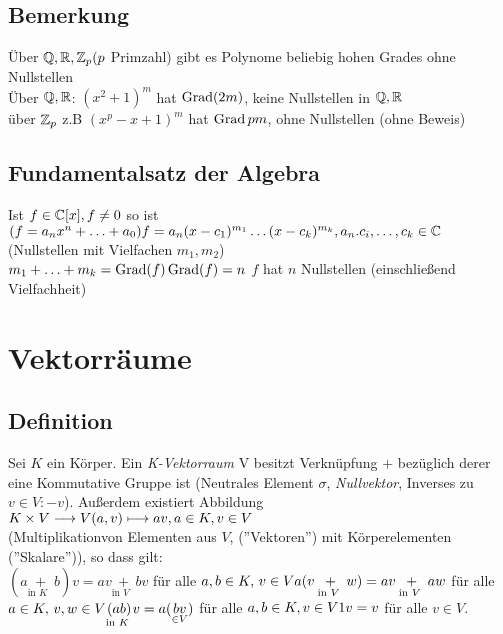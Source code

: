 \subsection{Bemerkung}
Über $\mathbb{Q},\mathbb{R},\mathbb{Z}_p (p$ Primzahl) gibt es Polynome beliebig hohen Grades ohne Nullstellen\\
Über $\mathbb{Q},\mathbb{R}$: $(x^2 +1)^m$ hat $\operatorname{Grad}(2m)$, keine Nullstellen in $\mathbb{Q},\mathbb{R}$\\
über $\mathbb{Z}_p$ z.B $(x^p - x +1)^m$ hat $\operatorname{Grad} pm$, ohne Nullstellen (ohne Beweis)
\subsection{Fundamentalsatz der Algebra}
Ist $ f \in \mathbb{C}[x], f \ne  0$ so ist $(f=a_nx^n+\ldots+a_0)\\
f = a_n (x-c_1)^{m_1} \ldots (x-c_k)^{m_k}, a_n.c_i,\ldots,c_k \in \mathbb{C}$ (Nullstellen mit Vielfachen $m_1,m_2$)\\
$m_1 + \ldots + m_k = \operatorname{Grad}(f)\\
\operatorname{Grad}(f) = n$ $f$ hat $n$ Nullstellen (einschlie\ss end Vielfachheit)
\section{Vektorräume}
\subsection{Definition}\label{sec:2.1}
Sei $K$ ein Körper. Ein \emph{K-Vektorraum}  V besitzt Verknüpfung $+$ bezüglich derer eine Kommutative Gruppe ist (Neutrales Element $\sigma$, \emph{Nullvektor}, Inverses zu $v \in V : -v$). Außerdem existiert Abbildung $K \times V \longrightarrow V\\
(a,v)\longmapsto av, a \in K, v \in V$\\
(\glqq Multiplikation\grqq von Elementen aus $V$, (''Vektoren'') mit Körperelementen (''Skalare'')), so dass gilt:\\ $(a \underset{\text{in $K$ }}{+} b)v = av \underset{\text{in $V$ }}{+} bv$ für alle $a,b \in K,\, v \in V\\
a(v\underset{\text{in $V$ }}{+}w) = av \underset{\text{in $V$ }}{+} aw$ für alle $a \in K,\, v,w \in V\\
\underset{\text{in $K$ }}{(ab)}v = a(\underset{\in V}{bv})$ für alle $a,b\in K, v \in V\\
1v = v$ für alle $v \in V$.

